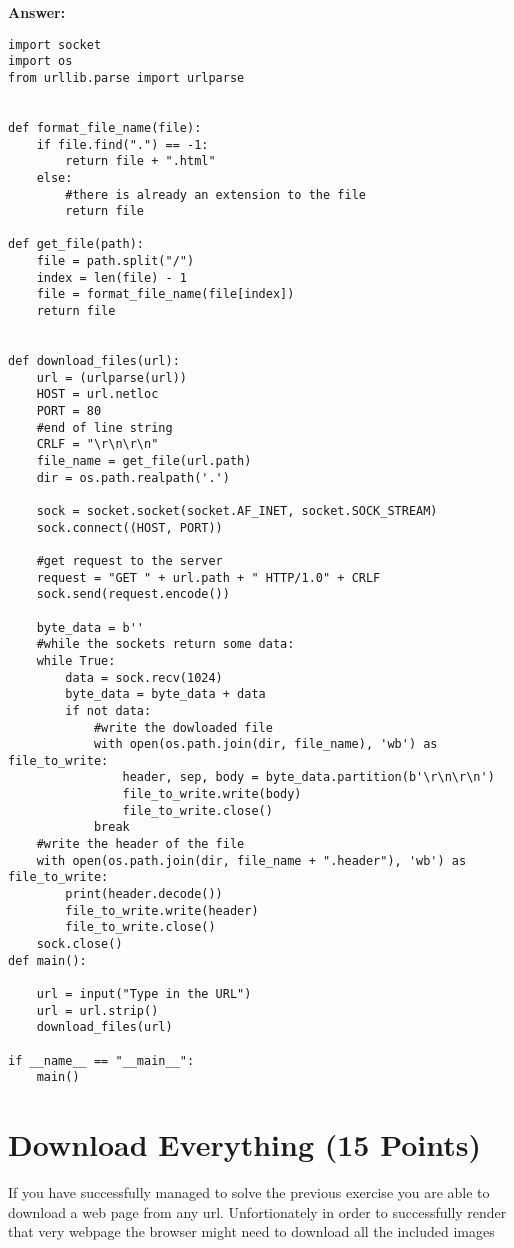 \documentclass{WeSTassignment}
\begin{document}
 \textbf{Answer: } \\
\begin{lstlisting}
import socket
import os
from urllib.parse import urlparse


def format_file_name(file):
    if file.find(".") == -1:
        return file + ".html"
    else:
        #there is already an extension to the file
        return file

def get_file(path):
    file = path.split("/")
    index = len(file) - 1
    file = format_file_name(file[index])
    return file


def download_files(url):
    url = (urlparse(url))
    HOST = url.netloc
    PORT = 80
    #end of line string
    CRLF = "\r\n\r\n"
    file_name = get_file(url.path)
    dir = os.path.realpath('.')

    sock = socket.socket(socket.AF_INET, socket.SOCK_STREAM)
    sock.connect((HOST, PORT))

    #get request to the server
    request = "GET " + url.path + " HTTP/1.0" + CRLF
    sock.send(request.encode())

    byte_data = b''
    #while the sockets return some data:
    while True:
        data = sock.recv(1024)
        byte_data = byte_data + data
        if not data:
            #write the dowloaded file
            with open(os.path.join(dir, file_name), 'wb') as file_to_write:
                header, sep, body = byte_data.partition(b'\r\n\r\n')
                file_to_write.write(body)
                file_to_write.close()
            break
    #write the header of the file
    with open(os.path.join(dir, file_name + ".header"), 'wb') as file_to_write:
        print(header.decode())
        file_to_write.write(header)
        file_to_write.close()
    sock.close()
def main():

    url = input("Type in the URL")
    url = url.strip()
    download_files(url)

if __name__ == "__main__":
    main()
\end{lstlisting}


\section{Download Everything (15 Points)}

If you have successfully managed to solve the previous exercise you are able to download a web page from any url. Unfortionately in order to successfully render that very webpage the browser might need to download all the included images
\end{document}
